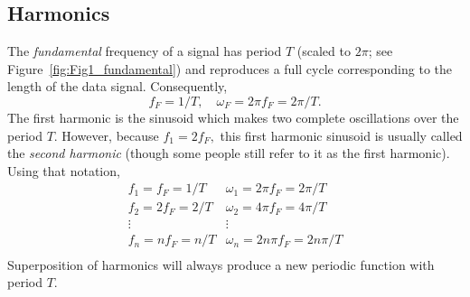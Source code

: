 \subsection{Harmonics}

The \emph{fundamental} frequency of a signal has period $T$ (scaled to $2\pi$; see Figure~\ref{fig:Fig1_fundamental})
and reproduces a full cycle corresponding to the length of the data signal.  Consequently, 
\begin{equation}
f_{F} = 1/T, \quad \omega_{F} = 2 \pi f_{F} = 2 \pi/T.
\end{equation}
The first harmonic is the sinusoid which makes two complete oscillations over the period $T$.  However, 
because $f_1 = 2f_F,$ this first harmonic sinusoid is usually called the \emph{second harmonic} (though 
some people still refer to it as the first harmonic).  Using that notation,
\begin{equation}
\begin{array}{ll}
f_1 = f_F = 1/T & \omega_{1} = 2\pi f_F = 2\pi/T\\
f_2 = 2f_F = 2/T & \omega_{2} = 4\pi f_F = 4\pi/T\\
\vdots & \vdots \\
f_n = nf_F = n/T & \omega_{n} = 2n\pi f_F= 2n\pi/T\\
\end{array}
\end{equation} 
Superposition of harmonics will always produce a new periodic function with period $T$.

